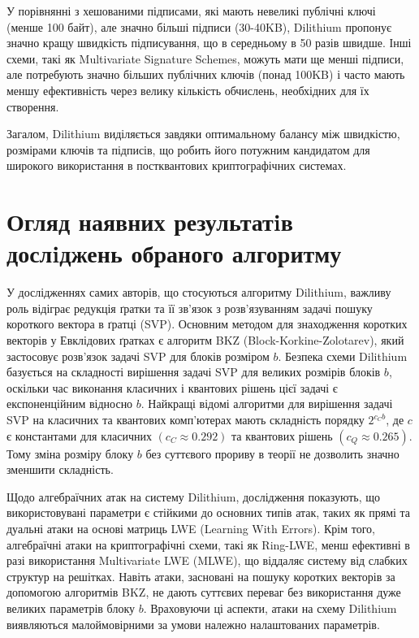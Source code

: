 \documentclass[12pt]{HomusWorkus}
\begin{document}
У порівнянні з хешованими підписами, які мають невеликі публічні ключі (менше 100 байт), але значно більші підписи (30-40KB), Dilithium пропонує значно кращу швидкість підписування, що в середньому в 50 разів швидше. Інші схеми, такі як Multivariate Signature Schemes, можуть мати ще менші підписи, але потребують значно більших публічних ключів (понад 100KB) і часто мають меншу ефективність через велику кількість обчислень, необхідних для їх створення.

Загалом, Dilithium виділяється завдяки оптимальному балансу між швидкістю, розмірами ключів та підписів, що робить його потужним кандидатом для широкого використання в постквантових криптографічних системах.

\section{Огляд наявних результатiв дослiджень обраного алгоритму}

У дослідженнях самих авторів, що стосуються алгоритму Dilithium, важливу роль відіграє редукція ґратки та її зв'язок з розв'язуванням задачі пошуку короткого вектора в ґратці (SVP). Основним методом для знаходження коротких векторів у Евклідових ґратках є алгоритм BKZ (Block-Korkine-Zolotarev), який застосовує розв'язок задачі SVP для блоків розміром $b$. Безпека схеми Dilithium базується на складності вирішення задачі SVP для великих розмірів блоків $b$, оскільки час виконання класичних і квантових рішень цієї задачі є експоненційним відносно $b$. Найкращі відомі алгоритми для вирішення задачі SVP на класичних та квантових комп'ютерах мають складність порядку $2^{c_C b}$, де $c$ є константами для класичних $(c_C \approx 0.292)$ та квантових рішень $(c_Q \approx 0.265)$. Тому зміна розміру блоку $b$ без суттєвого прориву в теорії не дозволить значно зменшити складність.

Щодо алгебраїчних атак на систему Dilithium, дослідження показують, що використовувані параметри є стійкими до основних типів атак, таких як прямі та дуальні атаки на основі матриць LWE (Learning With Errors). Крім того, алгебраїчні атаки на криптографічні схеми, такі як Ring-LWE, менш ефективні в разі використання Multivariate LWE (MLWE), що віддаляє систему від слабких структур на решітках. Навіть атаки, засновані на пошуку коротких векторів за допомогою алгоритмів BKZ, не дають суттєвих переваг без використання дуже великих параметрів блоку $b$. Враховуючи ці аспекти, атаки на схему Dilithium виявляються малоймовірними за умови належно налаштованих параметрів.
\end{document}
